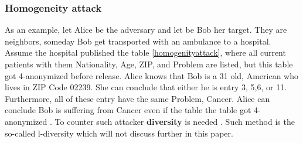 \documentclass{llncs}
\begin{document}
\subsubsection{Homogeneity attack}

As an example, let Alice be the adversary and let be Bob her target. They are neighbors, someday Bob get transported with an ambulance to a hospital. Assume the hospital published the table \ref{homogenityattack}, where all current patients with them Nationality, Age, ZIP, and Problem are listed, but this table got 4-anonymized before release. Alice knows that Bob is a 31 old, American who lives in ZIP Code 02239. She can conclude that either he is entry 3, 5,6, or 11. Furthermore, all of these entry have the same Problem, Cancer. Alice can conclude Bob is suffering from Cancer even if the table the table got 4-anonymized \cite{sweeney2002k,ldiversity}. To counter such attacker \textbf{diversity} is needed \cite{ldiversity}. Such method is the so-called l-diversity which will not discuss further in this paper.  
\end{document}
